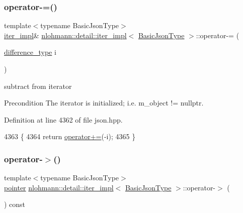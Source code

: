 \subsubsection{\texorpdfstring{operator-\/=()}{operator-=()}}
{\footnotesize\ttfamily template$<$typename Basic\+Json\+Type$>$ \\
\hyperlink{classnlohmann_1_1detail_1_1iter__impl}{iter\+\_\+impl}\& \hyperlink{classnlohmann_1_1detail_1_1iter__impl}{nlohmann\+::detail\+::iter\+\_\+impl}$<$ \hyperlink{classnlohmann_1_1detail_1_1iter__impl_abf18f18793f84b0222aebb5a2a87da7a}{Basic\+Json\+Type} $>$\+::operator-\/= (\begin{DoxyParamCaption}\item[{\hyperlink{classnlohmann_1_1detail_1_1iter__impl_a2f7ea9f7022850809c60fc3263775840}{difference\+\_\+type}}]{i }\end{DoxyParamCaption})\hspace{0.3cm}{\ttfamily [inline]}}



subtract from iterator 

\begin{DoxyPrecond}{Precondition}
The iterator is initialized; i.\+e. {\ttfamily m\+\_\+object != nullptr}. 
\end{DoxyPrecond}


Definition at line 4362 of file json.\+hpp.


\begin{DoxyCode}
4363     \{
4364         \textcolor{keywordflow}{return} \hyperlink{classnlohmann_1_1detail_1_1iter__impl_a3eef94f9d167046e7f773aeb6b78090c}{operator+=}(-i);
4365     \}
\end{DoxyCode}
\mbox{\label{classnlohmann_1_1detail_1_1iter__impl_a6da3d2b34528aff328f3dcb513076dec}} 
\subsubsection{\texorpdfstring{operator-\/$>$()}{operator->()}}
{\footnotesize\ttfamily template$<$typename Basic\+Json\+Type$>$ \\
\hyperlink{classnlohmann_1_1detail_1_1iter__impl_a69e52f890ce8c556fd68ce109e24b360}{pointer} \hyperlink{classnlohmann_1_1detail_1_1iter__impl}{nlohmann\+::detail\+::iter\+\_\+impl}$<$ \hyperlink{classnlohmann_1_1detail_1_1iter__impl_abf18f18793f84b0222aebb5a2a87da7a}{Basic\+Json\+Type} $>$\+::operator-\/$>$ (\begin{DoxyParamCaption}{ }\end{DoxyParamCaption}) const\hspace{0.3cm}{\ttfamily [inline]}}



